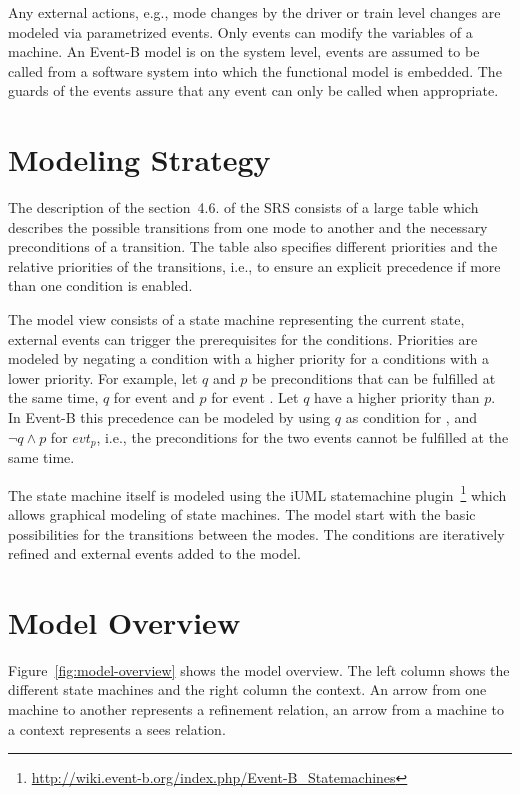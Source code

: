 \documentclass{template/openetcs_article}
\begin{document}
Any external actions, e.g., mode changes by the driver or train level changes
are modeled via parametrized events. Only events can modify the variables of a
machine. An Event-B model is on the system level, events are assumed to be
called from a software system into which the functional model is embedded. The
guards of the events assure that any event can only be called when appropriate.

\section{Modeling Strategy}
\label{sec:modeling-strategy}

The description of the section~4.6. of the SRS consists of a large table which
describes the possible transitions from one mode to another and the necessary
preconditions of a transition. The table also specifies different priorities and
the relative priorities of the transitions, i.e., to ensure an explicit
precedence if more than one condition is enabled.

The model view consists of a state machine representing the current state,
external events can trigger the prerequisites for the conditions. Priorities are
modeled by negating a condition with a higher priority for a conditions with a
lower priority. For example, let $q$ and $p$ be preconditions that can be
fulfilled at the same time, $q$ for event  and $p$ for event
. Let $q$ have a higher priority than $p$. In Event-B this
precedence can be modeled by using $q$ as condition for , and
$\neg q \wedge p$ for $evt_p$, i.e., the preconditions for the two events cannot
be fulfilled at the same time.

The state machine itself is modeled using the iUML statemachine
plugin~\footnote{\url{http://wiki.event-b.org/index.php/Event-B_Statemachines}}
which allows graphical modeling of state machines. The model start with the
basic possibilities for the transitions between the modes. The conditions are
iteratively refined and external events added to the model.

\section{Model Overview}
\label{sec:model-overview}

Figure~\ref{fig:model-overview} shows the model overview. The left column shows
the different state machines and the right column the context. An arrow from one
machine to another represents a refinement relation, an arrow from a machine to
a context represents a sees relation.
\end{document}
